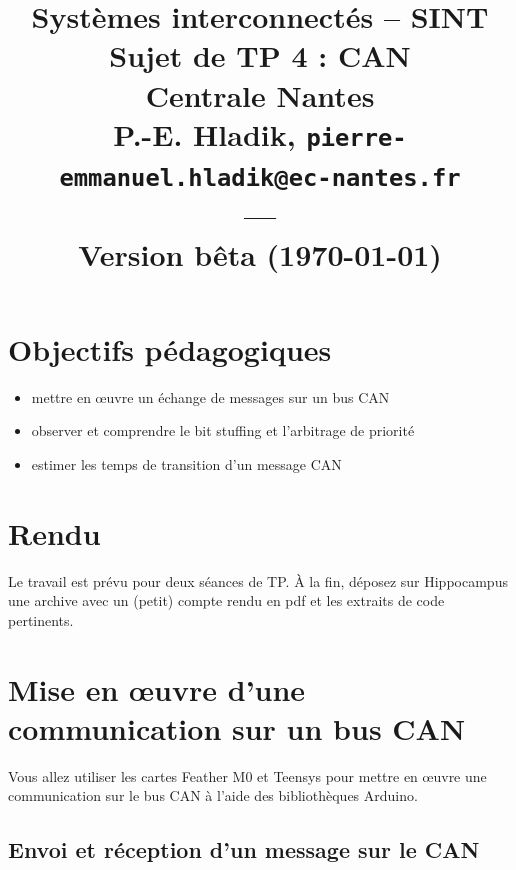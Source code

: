 \documentclass[11pt]{paper}
\title{{\Large Systèmes interconnectés -- SINT }\\
\vspace{-0.4em}
{\large Sujet de TP 4 : CAN}\\
{\small Centrale Nantes}\\
\small P.-E. Hladik, \small{\texttt{pierre-emmanuel.hladik@ec-nantes.fr}}\\
---\\
{\scriptsize  Version bêta (\today)}\\
}
\begin{document}
\maketitle


  \section{Objectifs pédagogiques}


\begin{itemize}
	\item mettre en œuvre un échange de messages sur un bus CAN
	\item observer et comprendre le bit stuffing et l'arbitrage de priorité
	\item estimer les temps de transition d'un message CAN
\end{itemize}

  \section{Rendu}

Le travail est prévu pour deux séances de TP. À la fin, déposez sur Hippocampus une archive avec un (petit) compte rendu en pdf et les extraits de code pertinents.


  \section{Mise en œuvre d'une communication sur un bus CAN}

Vous allez utiliser les cartes Feather M0 et Teensys pour mettre en œuvre une communication sur le bus CAN à l'aide des bibliothèques Arduino.

\subsection{Envoi et réception d'un message sur le CAN}
\label{sec:leds}
\end{document}
